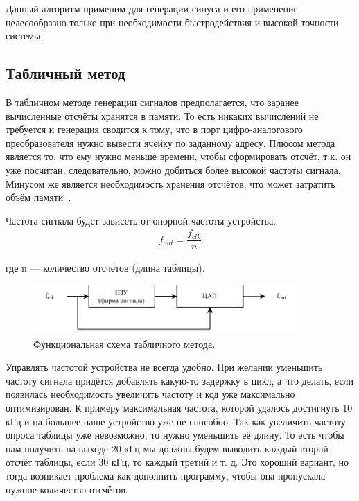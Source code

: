 	Данный алгоритм применим для генерации синуса и его применение целесообразно только при необходимости быстродействия и высокой точности системы.
	
\subsection{Табличный метод}		
	В табличном методе генерации сигналов предполагается, что заранее вычисленные отсчёты хранятся в памяти. То есть никаких вычислений не требуется и генерация сводится к тому, что в порт цифро-аналогового преобразователя нужно вывести ячейку по заданному адресу. 
	Плюсом метода является то, что ему нужно меньше времени, чтобы сформировать отсчёт, т.к. он уже посчитан, следовательно, можно добиться более высокой частоты сигнала. Минусом же является необходимость хранения отсчётов, что может затратить объём памяти~\cite{leso}.
	
	Частота сигнала будет зависеть от опорной частоты устройства.
	\begin{gather}
	f_{out}=\dfrac{f_{clk}}{n}
	\end{gather}	
	
	где n --- количество отсчётов (длина таблицы).	
	
	\begin{figure}[H]
	\centering
    \includegraphics[width=0.9\textwidth]{../image/table_func.pdf}
    \caption{Функциональная схема табличного метода.}
	\end{figure}
	
	Управлять частотой устройства не всегда удобно. При желании уменьшить частоту сигнала придётся добавлять какую-то задержку в цикл, а что делать, если появилась необходимость увеличить частоту и код уже максимально оптимизирован. К примеру максимальная частота, которой удалось достигнуть 10 кГц и на большее наше устройство уже не способно. Так как увеличить частоту опроса таблицы уже невозможно, то нужно уменьшить её длину. То есть чтобы нам получить на выходе 20 кГц мы должны будем выводить каждый второй отсчёт таблицы, если 30 кГц, то каждый третий и т. д. Это хороший вариант, но тогда возникает проблема как дополнить программу, чтобы она пропускала нужное количество отсчётов.




